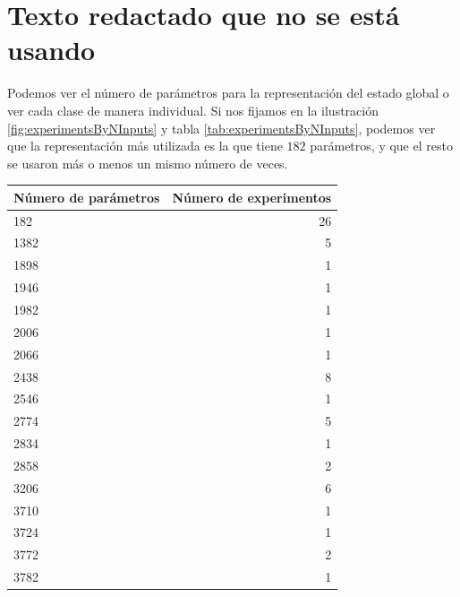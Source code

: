 \section{Texto redactado que no se está usando}

Podemos ver el número de parámetros para la representación del estado global o ver cada clase de manera individual. Si nos fijamos en la ilustración \ref{fig:experimentsByNInputs} y tabla \ref{tab:experimentsByNInputs}, podemos ver que la representación más utilizada es la que tiene $182$ parámetros, y que el resto se usaron más o menos un mismo número de veces.

\begin{table}[h]
    \centering
    {\small
        \begin{tabular}{lr}
            \toprule
            Número de parámetros & Número de experimentos \\
            \midrule
            182                  & 26                     \\
            1382                 & 5                      \\
            1898                 & 1                      \\
            1946                 & 1                      \\
            1982                 & 1                      \\
            2006                 & 1                      \\
            2066                 & 1                      \\
            2438                 & 8                      \\
            2546                 & 1                      \\
            2774                 & 5                      \\
            2834                 & 1                      \\
            2858                 & 2                      \\
            3206                 & 6                      \\
            3710                 & 1                      \\
            3724                 & 1                      \\
            3772                 & 2                      \\
            3782                 & 1                      \\

\end{tabular}}
\end{table}
